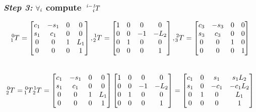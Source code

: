 \documentclass[10pt]{article}
\begin{document}
\subsubsection*{\textit{\textbf{Step 3: }}$\bf{\it{\forall_{i}}}$ compute $\bf{\it{ \tensor*[^{i-1}_{i}]{T}{}}}$}
\[
\tensor*[^{0}_{1}]{T}{} =
\begin{bmatrix}
    c_{1}        & -s_{1}       & 0     & 0      \\
    s_{1}        & c_{1}        & 0     & 0      \\
    0            & 0            & 1     & L_{1}  \\
    0            & 0            & 0     & 1
\end{bmatrix}, 
\tensor*[^{1}_{2}]{T}{} =
\begin{bmatrix}
    1            & 0            & 0     & 0      \\
    0            & 0            & -1    & -L_{2} \\
    0            & 1            & 0     & 0      \\
    0            & 0            & 0     & 1
\end{bmatrix}, 
\tensor*[^{2}_{3}]{T}{} =
\begin{bmatrix}
    c_{3}        & -s_{3}       & 0     & 0      \\
    s_{3}        & c_{3}        & 0     & 0      \\
    0            & 0            & 1     & 0      \\
    0            & 0            & 0     & 1
\end{bmatrix}\] \\
\[
\tensor*[^{0}_{2}]{T}{} = 
\tensor*[^{0}_{1}]{T}{} \tensor*[^{1}_{2}]{T}{} = 
\begin{bmatrix}
    c_{1}        & -s_{1}       & 0     & 0      \\
    s_{1}        & c_{1}        & 0     & 0      \\
    0            & 0            & 1     & L_{1}  \\
    0            & 0            & 0     & 1
\end{bmatrix}
\begin{bmatrix}
    1            & 0            & 0     & 0      \\
    0            & 0            & -1    & -L_{2} \\
    0            & 1            & 0     & 0      \\
    0            & 0            & 0     & 1
\end{bmatrix} =
\begin{bmatrix}
    c_{1}        & 0            & s_{1} & s_{1}L_{2}    \\
    s_{1}        & 0            & -c_{1}& -c_{1}L_{2}   \\
    0            & 1            & 0     & L_{1}         \\
    0            & 0            & 0     & 1
\end{bmatrix}
\] \\
\end{document}
